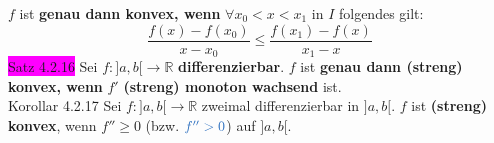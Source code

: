 \documentclass[landscape, 10pt]{article}
\newcommand{\R}{\mathbb{R}}
\begin{document}
\begin{multicols}{3}
                     \textcolor{NavyBlue}{$f$}
                     ist \textbf{genau dann konvex, wenn} 
                     \textcolor{NavyBlue}{$\forall x_0<x<x_1$} in 
                     \textcolor{NavyBlue}{$I$}
                     folgendes gilt: 
                     \begin{equation*}
                           \frac{f(x)-f(x_0)}{x-x_0}
                     \leqslant\frac{f(x_1)-f(x)}{x_1-x} 
                     \end{equation*}
              \colorbox{magenta}{Satz 4.2.16} 
                     Sei \textcolor{NavyBlue}{
                     $f:]a,b[\longrightarrow\R$}
                     \textbf{differenzierbar}. 
                     \textcolor{NavyBlue}{$f$} ist 
                     \textbf{genau dann (streng) konvex, wenn} 
                     \textcolor{NavyBlue}{$f'$} 
                     \textbf{(streng) monoton
                     wachsend} ist.\\
              \colorbox{BurntOrange}{Korollar 4.2.17} 
                     Sei \textcolor{NavyBlue}{$f:]a,b[\longrightarrow\R$}
                     zweimal differenzierbar in \textcolor{NavyBlue}{$]a,b[$}. 
                     \textcolor{NavyBlue}{$f$} ist \textbf{(streng) konvex}, 
                     wenn \textcolor{NavyBlue}{$f''\geqslant0$} (bzw. 
                     $\textcolor{NavyBlue}{f''>0}$) auf 
                     \textcolor{NavyBlue}{$]a,b[$}.

\end{multicols}
\end{document}
